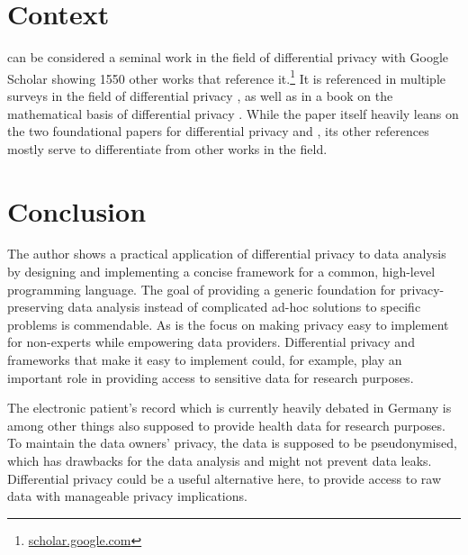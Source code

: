 \section{Context}

 can be considered a seminal work in the field of differential privacy with Google Scholar showing 1550 other works that reference it.\footnote{\href{https://scholar.google.com/scholar?q=mcsherry+privacy+integrated+queries}{scholar.google.com}}
It is referenced in multiple surveys in the field of differential privacy \parencites{dwork_differential_2008}{hassan_differential_2019}{xiao_edge_2019}, as well as in a book on the mathematical basis of differential privacy \parencite[]{dwork_algorithmic_2014}.
While the paper itself heavily leans on the two foundational papers for differential privacy \cite[]{dwork_calibrating_2006} and \cite[]{dwork_differential_2006}, its other references mostly serve to differentiate from other works in the field.

\section{Conclusion}

The author shows a practical application of differential privacy to data analysis by designing and implementing a concise framework for a common, high-level programming language.
The goal of providing a generic foundation for privacy-preserving data analysis instead of complicated ad-hoc solutions to specific problems is commendable.
As is the focus on making privacy easy to implement for non-experts while empowering data providers.
Differential privacy and frameworks that make it easy to implement could, for example, play an important role in providing access to sensitive data for research purposes.

The electronic patient's record which is currently heavily debated in Germany is among other things also supposed to provide health data for research purposes.
To maintain the data owners' privacy, the data is supposed to be pseudonymised, which has drawbacks for the data analysis and might not prevent data leaks. \parencite[]{tagesschaude_gesundheitswesen_nodate}
Differential privacy could be a useful alternative here, to provide access to raw data with manageable privacy implications.